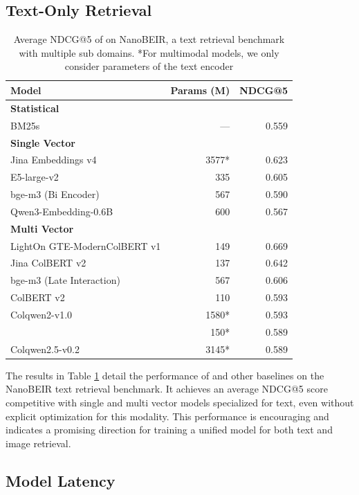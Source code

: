 \subsection{Text-Only Retrieval}
\begin{table}[h]
\centering
\begin{tabular}{l r r}
  \toprule
  Model & Params (M) & NDCG@5 \\
  \midrule
  \multicolumn{3}{l}{\textbf{Statistical}} \\
  BM25s & — & 0.559 \\
  \midrule
  \multicolumn{3}{l}{\textbf{Single Vector}} \\
  Jina Embeddings v4 & 3577* & 0.623 \\
  E5-large-v2 & 335 & 0.605 \\
  bge-m3 (Bi Encoder) & 567 & 0.590 \\
  Qwen3-Embedding-0.6B & 600 & 0.567 \\
  \midrule
  \multicolumn{3}{l}{\textbf{Multi Vector}} \\
  LightOn GTE-ModernColBERT v1 & 149 & 0.669 \\
  Jina ColBERT v2 & 137 & 0.642 \\
  bge-m3 (Late Interaction) & 567 & 0.606 \\
  ColBERT v2 & 110 & 0.593 \\
  Colqwen2-v1.0 & 1580* & 0.593\\
  \colflagship{} & 150* & 0.589 \\
  Colqwen2.5-v0.2 & 3145* & 0.589\\
  \bottomrule
\end{tabular}
\caption{Average NDCG@5 of \colflagship{} on NanoBEIR, a text retrieval benchmark with multiple sub domains. *For multimodal models, we only consider parameters of the text encoder}
\label{appendix:text_perf}
\end{table}

The results in Table \ref{appendix:text_perf} detail the performance of \colflagship{} and other baselines on the NanoBEIR text retrieval benchmark. It achieves an average NDCG@5 score competitive with single and multi vector models specialized for text, even without explicit optimization for this modality. This performance is encouraging and indicates a promising direction for training a unified model for both text and image retrieval.

\subsection{Model Latency}

